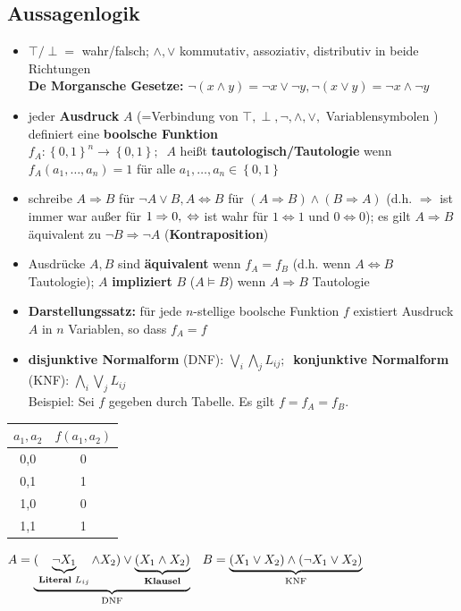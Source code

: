 \documentclass[10pt,a4paper]{article}
\begin{document}
\subsection{Aussagenlogik}
\begin{itemize}
\item $\top/\perp=$ wahr/falsch; $\land, \lor$ kommutativ, assoziativ, distributiv in beide Richtungen\\ \textbf{De Morgansche Gesetze:} $\lnot (x\land y)=\lnot x \lor \lnot y, \lnot (x\lor y)=\lnot x \land \lnot y$
\item jeder \textbf{Ausdruck} $A$ (=Verbindung von $\top,\perp,\lnot,\land,\lor,$ Variablensymbolen ) definiert eine \textbf{boolsche Funktion} \\ $f_{A}: \left\lbrace 0,1\right\rbrace ^{n} \rightarrow \left\lbrace 0,1\right\rbrace;\;\;A$ heißt \textbf{tautologisch/Tautologie} wenn $f_{A}(a_{1},\dotsc, a_{n})=1$ für alle $a_{1},\dotsc, a_{n} \in \left\lbrace 0,1\right\rbrace$  
\item schreibe $A\Rightarrow B$ für $\lnot A\lor B, A\Leftrightarrow B$ für $(A\Rightarrow B)\land (B\Rightarrow A)$ (d.h. $\Rightarrow$ ist immer war außer für $1 \Rightarrow 0,\\ \Leftrightarrow$ ist wahr für $1\Leftrightarrow 1$ und $0\Leftrightarrow 0$); es gilt $A\Rightarrow B$ äquivalent zu $\lnot B\Rightarrow \lnot A$ (\textbf{Kontraposition})
\item Ausdrücke $A,B$ sind \textbf{äquivalent} wenn $f_{A}=f_{B}$ (d.h. wenn $A\Leftrightarrow B $ Tautologie); $A$ \textbf{impliziert} $B$ ($A\models B$) wenn $A\Rightarrow B$ Tautologie
\item \textbf{Darstellungssatz:} für jede $n$-stellige boolsche Funktion $f$ existiert Ausdruck $A$ in $n$ Variablen, so dass $f_{A}=f$
\item  \textbf{disjunktive Normalform} (DNF): $\bigvee_{i} \bigwedge_{j} L_{ij};\;\;$\textbf{konjunktive Normalform} (KNF): $\bigwedge_{i} \bigvee_{j} L_{ij}$\\
Beispiel: Sei $f$ gegeben durch Tabelle. Es gilt $f=f_{A}=f_{B}$.
\end{itemize}
 \begin{tabular}{c|c}
$a_{1},a_{2}$ & $f(a_{1},a_{2})$\\
\hline
0,0&0\\
0,1&1\\
1,0&0\\
1,1&1
\end{tabular} $A=\underbrace{(\underbrace{\lnot X_{1}}_{\text{\textbf{Literal} } L_{ij}} \land X_{2})\lor \underbrace{(X_{1}\land X_{2})}_{\text{\textbf{Klausel}}}}_{\text{DNF}}\;\;\;B=\underbrace{(X_{1}\lor X_{2})\land (\lnot X_{1}\lor X_{2})}_{\text{KNF}}$
\end{document}

